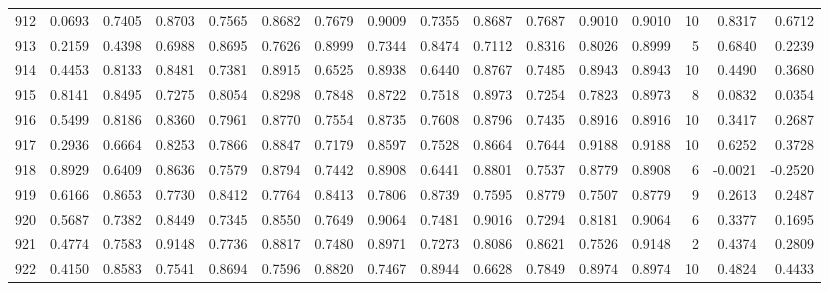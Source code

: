 \begin{tabular}{lrrrrrrrrrrrrrrr}
912 &      0.0693 &  0.7405 &  0.8703 &  0.7565 &  0.8682 &  0.7679 &  0.9009 &  0.7355 &  0.8687 &  0.7687 &   0.9010 &     0.9010 &     10 &                    0.8317 &                     0.6712 \\
913 &      0.2159 &  0.4398 &  0.6988 &  0.8695 &  0.7626 &  0.8999 &  0.7344 &  0.8474 &  0.7112 &  0.8316 &   0.8026 &     0.8999 &      5 &                    0.6840 &                     0.2239 \\
914 &      0.4453 &  0.8133 &  0.8481 &  0.7381 &  0.8915 &  0.6525 &  0.8938 &  0.6440 &  0.8767 &  0.7485 &   0.8943 &     0.8943 &     10 &                    0.4490 &                     0.3680 \\
915 &      0.8141 &  0.8495 &  0.7275 &  0.8054 &  0.8298 &  0.7848 &  0.8722 &  0.7518 &  0.8973 &  0.7254 &   0.7823 &     0.8973 &      8 &                    0.0832 &                     0.0354 \\
916 &      0.5499 &  0.8186 &  0.8360 &  0.7961 &  0.8770 &  0.7554 &  0.8735 &  0.7608 &  0.8796 &  0.7435 &   0.8916 &     0.8916 &     10 &                    0.3417 &                     0.2687 \\
917 &      0.2936 &  0.6664 &  0.8253 &  0.7866 &  0.8847 &  0.7179 &  0.8597 &  0.7528 &  0.8664 &  0.7644 &   0.9188 &     0.9188 &     10 &                    0.6252 &                     0.3728 \\
918 &      0.8929 &  0.6409 &  0.8636 &  0.7579 &  0.8794 &  0.7442 &  0.8908 &  0.6441 &  0.8801 &  0.7537 &   0.8779 &     0.8908 &      6 &                   -0.0021 &                    -0.2520 \\
919 &      0.6166 &  0.8653 &  0.7730 &  0.8412 &  0.7764 &  0.8413 &  0.7806 &  0.8739 &  0.7595 &  0.8779 &   0.7507 &     0.8779 &      9 &                    0.2613 &                     0.2487 \\
920 &      0.5687 &  0.7382 &  0.8449 &  0.7345 &  0.8550 &  0.7649 &  0.9064 &  0.7481 &  0.9016 &  0.7294 &   0.8181 &     0.9064 &      6 &                    0.3377 &                     0.1695 \\
921 &      0.4774 &  0.7583 &  0.9148 &  0.7736 &  0.8817 &  0.7480 &  0.8971 &  0.7273 &  0.8086 &  0.8621 &   0.7526 &     0.9148 &      2 &                    0.4374 &                     0.2809 \\
922 &      0.4150 &  0.8583 &  0.7541 &  0.8694 &  0.7596 &  0.8820 &  0.7467 &  0.8944 &  0.6628 &  0.7849 &   0.8974 &     0.8974 &     10 &                    0.4824 &                     0.4433 \\

\end{tabular}
